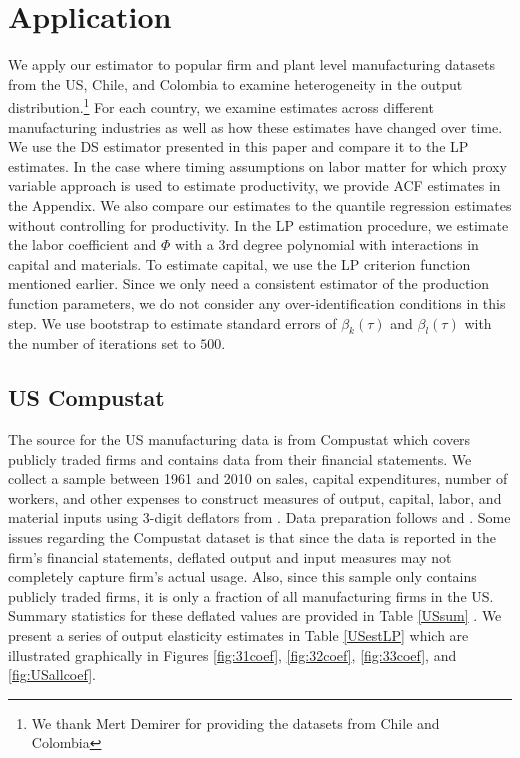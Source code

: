 \documentclass[11pt]{article}
\begin{document}
\section{Application} \label{application}
We apply our estimator to popular firm and plant level manufacturing datasets from the US, Chile, and Colombia to examine heterogeneity in the output distribution.\footnote{We thank Mert Demirer for providing the datasets from Chile and Colombia} For each country, we examine estimates across different manufacturing industries as well as how these estimates have changed over time. We use the DS estimator presented in this paper and compare it to the LP estimates. In the case where timing assumptions on labor matter for which proxy variable approach is used to estimate productivity, we provide ACF estimates in the Appendix. We also compare our estimates to the quantile regression estimates without controlling for productivity. In the LP estimation procedure, we estimate the labor coefficient and $\Phi$ with a 3rd degree polynomial with interactions in capital and materials. To estimate capital, we use the LP criterion function mentioned earlier. Since we only need a consistent estimator of the production function parameters, we do not consider any over-identification conditions in this step. We use bootstrap to estimate standard errors of $\beta_{k}(\tau)$ and $\beta_{l}(\tau)$ with the number of iterations set to $500$.
\subsection{US Compustat}
The source for the US manufacturing data is from Compustat which covers publicly traded firms and contains data from their financial statements. We collect a sample between 1961 and 2010 on sales, capital expenditures, number of workers, and other expenses to construct measures of output, capital, labor, and material inputs using 3-digit deflators from \cite{nber}. Data preparation follows \cite{Keller2009} and \cite{mert}. Some issues regarding the Compustat dataset is that since the data is reported in the firm's financial statements, deflated output and input measures may not completely capture firm's actual usage. Also, since this sample only contains publicly traded firms, it is only a fraction of all manufacturing firms in the US. Summary statistics for these deflated values are provided in Table \ref{USsum} . We present a series of output elasticity estimates in Table \ref{USestLP} which are illustrated graphically in Figures \ref{fig:31coef}, \ref{fig:32coef}, \ref{fig:33coef}, and \ref{fig:USallcoef}.
\end{document}
